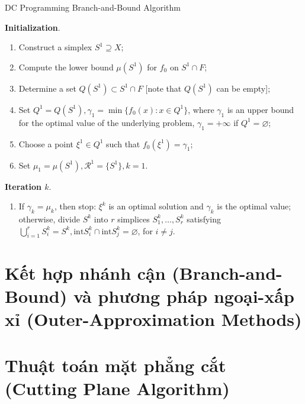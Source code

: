 \documentclass[a4paper]{report}
\begin{document}
    \begin{algorithm}
        
        DC Programming Branch-and-Bound Algorithm

        \textbf{Initialization}. 

        \begin{enumerate}[label=(\roman*)]
            \item Construct a simplex $S^1 \supseteq X$;
            \item Compute the lower bound $\mu(S^1)$ for $f_0$ on $S^1 \cap F$;
            \item Determine a set $Q(S^1) \subset S^1 \cap F$ [note that $Q(S^1)$ can be empty];
            \item Set $Q^1 = Q(S^1), \gamma_1 = \min\{f_0(x): x \in Q^1\}$, where $\gamma_1$ is an upper bound for the optimal value of the underlying problem, $\gamma_1 = +\infty$ if $Q^1 = \varnothing$;
            \item Choose a point $\xi^1 \in Q^1$ such that $f_0(\xi^1) = \gamma_1$;
            \item Set $\mu_1 = \mu(S^1), \mathscr{R}^1 = \{S^1\}, k = 1$.
        \end{enumerate}

        \textbf{Iteration $k$}.
        \begin{enumerate}[label=(\roman*)]
            \item If $\gamma_k = \mu_k$, then stop: $\xi^k$ is an optimal solution and $\gamma_k$ is the optimal value; otherwise, divide $S^k$ into $r$ simplices $S^k_1, \dots, S^k_r$ satisfying $\bigcup_{i=1}^rS_i^k = S^k, \text{int}S^k_i \cap \text{int}S^k_j = \varnothing$, for $i \ne j$.
        \end{enumerate} 
    \end{algorithm}

    \section{Kết hợp nhánh cận (Branch-and-Bound) và phương pháp ngoại-xấp xỉ (Outer-Approximation Methods)}
    \label{sec:mix_branchbound_outerapproximation}

    \section{Thuật toán mặt phẳng cắt (Cutting Plane Algorithm)}
    \label{sec:cutting_plance_algorithm}

    \nocite{*}
\end{document}
